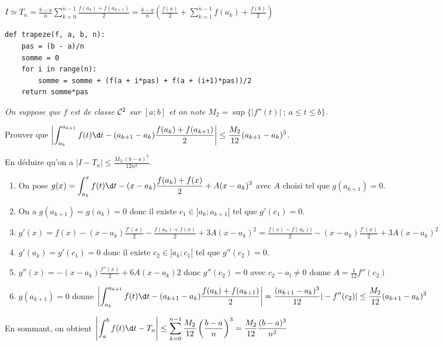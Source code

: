 $\displaystyle I \simeq T_n = \frac{b-a}{n}  \sum_{k=0}^{n-1} \frac{f(a_k)+f(a_{k+1})}{2}
=\frac{b-a}{n}\left(\frac{f(a)}{2}+  \sum_{k=1}^{n-1} f(a_k)+\frac{f(b)}{2}\right)$
\medskip
\begin{lstlisting}[caption = {Méthode des trapèzes}]
def trapeze(f, a, b, n):
    pas = (b - a)/n
    somme = 0
    for i in range(n):
        somme = somme + (f(a + i*pas) + f(a + (i+1)*pas))/2
    return somme*pas
\end{lstlisting}
\begin{Exercise}[title=Mesure de l'erreur]\it
On suppose que $f$ est de classe ${\cal C}^2$ sur $[a;b]$ et on note $M_2 = \sup\bigl\{|f''(t)|\ ;\ a \le t \le b\bigr\}$.

Prouver que $\displaystyle \left|\int_{a_k}^{a_{k+1}} f(t)\d t -(a_{k+1}- a_k) \frac{f(a_k)+f(a_{k+1})}{2}\right| \le \frac{M_2}{12}(a_{k+1}- a_k)^3$.

En déduire qu'on a $\displaystyle \bigl|I-T_n\bigr|\le \frac{M_2.(b-a)^3}{12n^2}$.
\end{Exercise}
\begin{Answer}
\begin{enumerate}
    \item On pose $\displaystyle g(x) = \int_{a_k}^x f(t) \d t -(x - a_k)\frac{f(a_k)+f(x)}2 +A (x-a_k)^3$ avec $A$ choisi tel que $g(a_{k+1}) = 0$.
    \item On a $g(a_{k+1}) = g(a_k) = 0$ donc il existe $c_1\in ]a_k;a_{k+1}[$ tel que $g'(c_1)=0$.
    \item $g'(x) = f(x) - (x - a_k)\frac{f'(x)}2 - \frac{f(a_k)+f(x)}2 +3A(x-a_k)^2
    = \frac{f(x) - f(a_k))}2 - (x - a_k)\frac{f'(x)}2  +3A(x-a_k)^2$
    \item $g'(a_k) = g'(c_1) = 0$ donc il existe $c_2\in ]a_k;c_1[$ tel que $g''(c_2)=0$.
    \item $g''(x) = - (x - a_k)\frac{f''(x)}2  +6A(x-a_k)2$ donc $g''(c_2)=0$ avec $c_2-a_l \ne 0$ donne $A = \frac 1{12}f''(c_2)$
    \item $g(a_{k+1}) = 0$ donne
    $\displaystyle \left|\int_{a_k}^{a_{k+1}} f(t) \d t -(a_{k+1} - a_k)\frac{f(a_k)+f(a_{k+1})}2\right| = \frac {(a_{k+1} - a_k)^3}{12}|-f''(c_2)|\le  \frac{M_2}{12}(a_{k+1} - a_k)^3 $
\end{enumerate}
En sommant, on obtient $\displaystyle \left|\int_a^b f(t)\d t - T_n\right| \le  \sum_{k=0}^{n-1}\frac{M_2}{12} \left(\frac{b-a}{n}\right)^3  
= \frac{M_2}{12}  \frac{(b-a)^3}{n^2} $
\end{Answer}

